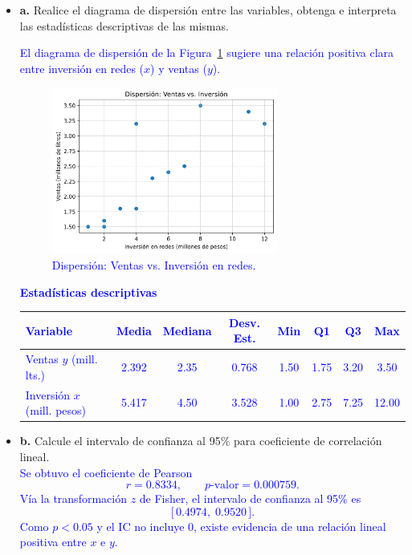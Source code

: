 \documentclass[10pt]{article}
\begin{document}
\begin{itemize}
    \item \textbf{a.} Realice el diagrama de dispersión entre las variables, obtenga e interpreta las estadísticas descriptivas de las mismas.\\
\textcolor{blue}{
El diagrama de dispersión de la Figura~\ref{fig:sh_scatter} sugiere una relación positiva clara entre inversión en redes ($x$) y ventas ($y$).
\begin{figure}[H]
    \centering
    \includegraphics[width=0.70\textwidth]{../plots/python/ejercicio2/scatter_plot.png}
    \caption{Dispersión: Ventas vs. Inversión en redes.}
    \label{fig:sh_scatter}
\end{figure}
\noindent\textbf{Estadísticas descriptivas}
\begin{center}
\begin{tabular}{lccccccc}
\hline
Variable & Media & Mediana & Desv. Est. & Min & Q1 & Q3 & Max \\
\hline
Ventas $y$ (mill. lts.) & 2.392 & 2.35 & 0.768 & 1.50 & 1.75 & 3.20 & 3.50 \\
Inversión $x$ (mill. pesos) & 5.417 & 4.50 & 3.528 & 1.00 & 2.75 & 7.25 & 12.00 \\
\hline
\end{tabular}
\end{center}
}

    \item \textbf{b.} Calcule el intervalo de confianza al 95\% para coeficiente de correlación lineal.\\
\textcolor{blue}{
Se obtuvo el coeficiente de Pearson
\[ r = 0.8334, \qquad p\text{-valor} = 0.000759. \]
Vía la transformación $z$ de Fisher, el intervalo de confianza al 95\% es
\[ \big[\,0.4974,\;0.9520\,\big]. \]
Como $p<0.05$ y el IC no incluye 0, existe evidencia de una relación lineal positiva entre $x$ e $y$.
}


\end{itemize}
\end{document}
